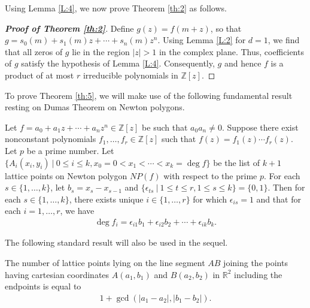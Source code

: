 \documentclass[12pt]{amsart}%
\begin{document}
Using Lemma \ref{L:4}, we now prove Theorem \ref{th:2} as follows.
\begin{proof}[\bf Proof of Theorem \ref{th:2}] Define $g(z)=f(m+z)$, so that $g=s_0(m)+s_1(m)z+\cdots +s_n(m)z^n$. Using Lemma \ref{L:2} for $d=1$, we find that all zeros of $g$ lie in the region $|z|>1$ in the complex plane. Thus, coefficients of $g$ satisfy the hypothesis of Lemma \ref{L:4}. Consequently, $g$ and hence $f$ is a product of at most $r$ irreducible polynomials in $\mathbb{Z}[z]$.
\end{proof}
To prove Theorem \ref{th:5}, we will make use of the following fundamental result resting on Dumas Theorem \cite{D} on Newton polygons.
\begin{thmx}\label{th:B}
Let $f=a_0+a_1 z+\cdots +a_n z^n\in \mathbb{Z}[z]$ be such that $a_0a_n\neq 0$. Suppose there exist nonconstant polynomials $f_1,\ldots, f_r\in \mathbb{Z}[z]$ such that $f(z)=f_1(z)\cdots f_r(z)$. Let $p$ be a prime number. Let $\{A_i(x_i,y_i) ~|~ 0\leq i\leq k, x_0=0<x_1<\cdots <x_k=\deg f\}$ be the list of $k+1$ lattice points on Newton polygon $NP(f)$ with respect to the prime $p$. For each $s\in \{1,\ldots, k\}$, let $b_s=x_s-x_{s-1}$ and $\{\epsilon_{ts} ~|~ 1\leq t\leq r, 1\leq s\leq k\}=\{0,1\}$. Then for each $s\in \{1,\ldots, k\}$, there exists unique $i\in \{1,\ldots,r\}$ for which $\epsilon_{is}=1$ and that for each $i=1,\ldots, r$, we have
\begin{eqnarray*}
\deg f_i =\epsilon_{i1}b_1+\epsilon_{i2}b_2+\cdots+\epsilon_{ik}b_k.
\end{eqnarray*}
\end{thmx}
The following standard result will also be used in the sequel.
\begin{lemma}\label{L:7}
The number of lattice points lying on the line segment $AB$ joining the points having cartesian coordinates $A(a_1,b_1)$ and $B(a_2,b_2)$ in $\mathbb{R}^2$ including the endpoints  is equal to
\begin{eqnarray*}
1+\gcd(|a_1-a_2|,|b_1-b_2|).
\end{eqnarray*}
\end{lemma}
\end{document}
